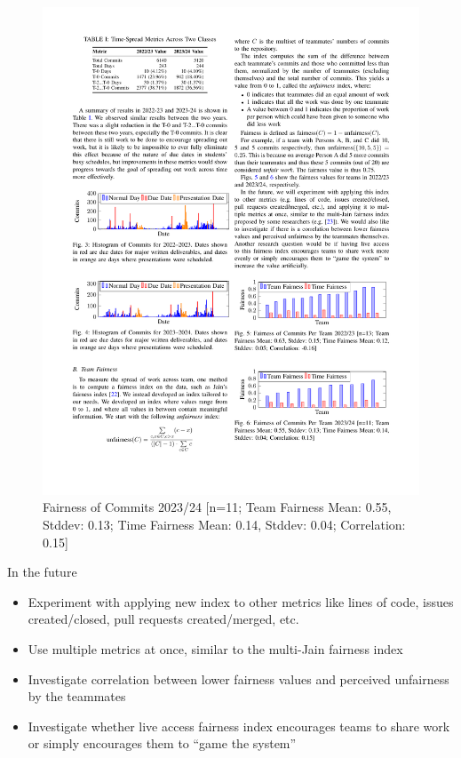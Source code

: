 \documentclass[poster, a0, plainboxedsections]{sciposter}
\begin{document}
\begin{multicols}{2}
\begin{figure}[h]
\centering
\includegraphics[width=1.0\linewidth]{../figures/FairnessCommits_23_24.pdf}
\caption{Fairness of Commits 2023/24 [n=11; Team Fairness Mean: 0.55, Stddev: 0.13; Time Fairness Mean: 0.14, Stddev: 0.04; Correlation: 0.15]}\label{Fig:Fairness2023/24}
\end{figure}

In the future
\begin{itemize}
    \item Experiment with applying new index to other metrics like lines of
    code, issues created/closed, pull requests created/merged, etc.
    \item Use multiple metrics at once, similar to the multi-Jain fairness
    index 
    \item Investigate correlation between lower fairness values and perceived
    unfairness by the teammates
    \item Investigate whether live access fairness index encourages teams to share
    work or simply encourages them to ``game the system''
\end{itemize}


\end{multicols}
\end{document}
